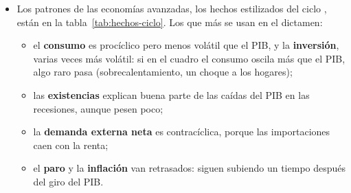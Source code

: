 \documentclass[11pt]{article}
\begin{document}
\begin{itemize}
\item Los patrones de las economías avanzadas, los hechos estilizados del ciclo , están en la tabla~\ref{tab:hechos-ciclo}. Los que más se usan en el dictamen:
  \begin{itemize}
  \item el \textbf{consumo} es procíclico pero menos volátil que el PIB, y la \textbf{inversión}, varias veces más volátil: si en el cuadro el consumo oscila más que el PIB, algo raro pasa (sobrecalentamiento, un choque a los hogares);
  \item las \textbf{existencias} explican buena parte de las caídas del PIB en las recesiones, aunque pesen poco;
  \item la \textbf{demanda externa neta} es contracíclica, porque las importaciones caen con la renta;
  \item el \textbf{paro} y la \textbf{inflación} van retrasados: siguen subiendo un tiempo después del giro del PIB.
  \end{itemize}
\end{itemize}
\end{document}
